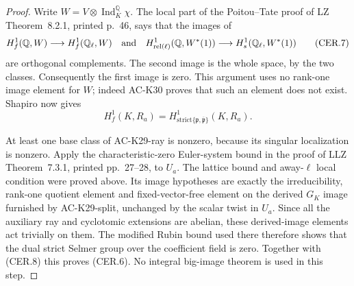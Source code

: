 \begin{proof}
Write $W=V\otimes\operatorname{Ind}_K^{\mathbb Q}\chi$.
The local part of the Poitou--Tate proof of LZ
Theorem~8.2.1, printed p.~46, says that the images of
\[
 H^1_f(\mathbb Q,W)\longrightarrow H^1_f(\mathbb Q_\ell,W)
 \quad\hbox{and}\quad
 H^1_{\mathrm{rel}(\ell)}(\mathbb Q,W^*(1))
       \longrightarrow H^1_s(\mathbb Q_\ell,W^*(1))
                                                            \tag{CER.7}
\]
are orthogonal complements.  The second image is the whole
space, by the two classes.  Consequently the first image is
zero.  This argument uses no rank-one image element for
$W$; indeed AC-K30 proves that such an element does not
exist.  Shapiro now gives
\[
 H^1_f(K,R_a)=H^1_{\mathrm{strict}\{\mathfrak p,
                    \overline{\mathfrak p}\}}(K,R_a).
                                                            \tag{CER.8}
\]

At least one base class of AC-K29-ray is nonzero, because
its singular localization is nonzero.  Apply the
characteristic-zero Euler-system bound in the proof of
LLZ Theorem~7.3.1, printed pp.~27--28, to $U_a$.
The lattice bound and away-$\ell$ local condition were
proved above.  Its image hypotheses are exactly the
irreducibility, rank-one quotient element and fixed-vector-free
element on the derived $G_K$ image furnished by
AC-K29-split, unchanged by the scalar twist in $U_a$.
Since all the auxiliary ray and cyclotomic extensions are
abelian, these derived-image elements act trivially on them.
The modified Rubin bound used there therefore shows that
the dual strict Selmer group over the coefficient field is
zero.  Together with (CER.8) this proves (CER.6).
No integral big-image theorem is used in this step.
\end{proof}

